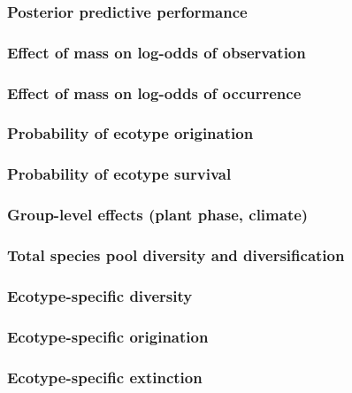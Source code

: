 \documentclass{beamer}
\begin{document}
\begin{frame}
  \frametitle{Posterior predictive performance}
\end{frame}

\begin{frame}
  \frametitle{Effect of mass on log-odds of observation}
\end{frame}

\begin{frame}
  \frametitle{Effect of mass on log-odds of occurrence}
\end{frame}

\begin{frame}
  \frametitle{Probability of ecotype origination}
\end{frame}

\begin{frame}
  \frametitle{Probability of ecotype survival}
\end{frame}

\begin{frame}
  \frametitle{Group-level effects (plant phase, climate)}
\end{frame}

\begin{frame}
  \frametitle{Total species pool diversity and diversification}
\end{frame}

\begin{frame}
  \frametitle{Ecotype-specific diversity}
\end{frame}

\begin{frame}
  \frametitle{Ecotype-specific origination}
\end{frame}

\begin{frame}
  \frametitle{Ecotype-specific extinction}
\end{frame}
\end{document}
